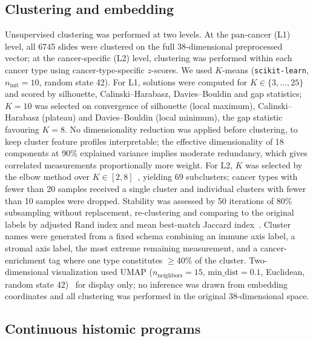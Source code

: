\subsection{Clustering and embedding}
\label{sec:methods:clustering}

Unsupervised clustering was performed at two levels. At the pan-cancer (L1)
level, all \num{6745} slides were clustered on the full 38-dimensional
preprocessed vector; at the cancer-specific (L2) level, clustering was performed
within each cancer type using cancer-type-specific $z$-scores. We used $K$-means
(\texttt{scikit-learn}, $n_{\mathrm{init}} = 10$, random state 42). For L1,
solutions were computed for $K \in \{3, \ldots, 25\}$ and scored by silhouette,
Calinski--Harabasz, Davies--Bouldin and gap statistics; $K = 10$ was selected on
convergence of silhouette (local maximum), Calinski--Harabasz (plateau) and
Davies--Bouldin (local minimum), the gap statistic favouring $K = 8$. No
dimensionality reduction was applied before clustering, to keep cluster feature
profiles interpretable; the effective dimensionality of 18 components at 90\%
explained variance implies moderate redundancy, which gives correlated
measurements proportionally more weight. For L2, $K$ was selected by the elbow
method over $K \in [2, 8]$~\cite{thorndike1953}, yielding 69 subclusters; cancer
types with fewer than 20 samples received a single cluster and individual
clusters with fewer than 10 samples were dropped. Stability was assessed by 50
iterations of 80\% subsampling without replacement, re-clustering and comparing
to the original labels by adjusted Rand index and mean best-match Jaccard
index~\cite{hennig2007}. Cluster names were generated from a fixed schema
combining an immune axis label, a stromal axis label, the most extreme remaining
measurement, and a cancer-enrichment tag where one type constitutes $\geq$40\% of
the cluster. Two-dimensional visualization used UMAP
($n_{\mathrm{neighbors}} = 15$, $\mathrm{min\_dist} = 0.1$, Euclidean, random
state 42)~\cite{mcinnes2018} for display only; no inference was drawn from
embedding coordinates and all clustering was performed in the original
38-dimensional space.

\subsection{Continuous histomic programs}
\label{sec:methods:programs}

